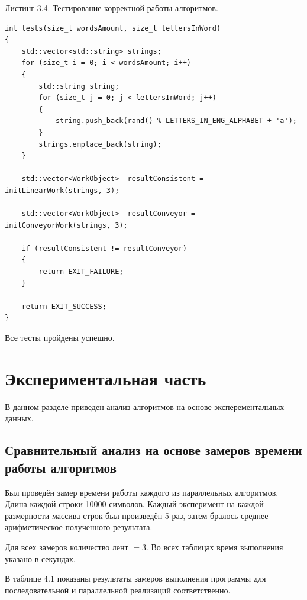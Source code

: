 \documentclass[12pt]{report}
\begin{document}
\begin{flushleft}
Листинг 3.4. Тестирование корректной работы алгоритмов.
\begin{lstlisting}
int tests(size_t wordsAmount, size_t lettersInWord) 
{
	std::vector<std::string> strings;
	for (size_t i = 0; i < wordsAmount; i++) 
	{
		std::string string;
		for (size_t j = 0; j < lettersInWord; j++) 
		{
			string.push_back(rand() % LETTERS_IN_ENG_ALPHABET + 'a');
		}
		strings.emplace_back(string);
	}
	
	std::vector<WorkObject>  resultConsistent = initLinearWork(strings, 3);
	
	std::vector<WorkObject>  resultConveyor = initConveyorWork(strings, 3);
	
	if (resultConsistent != resultConveyor)
	{
		return EXIT_FAILURE;
	}
	
	return EXIT_SUCCESS;
}
\end{lstlisting}
\end{flushleft}

Все тесты пройдены успешно.

\chapter{Экспериментальная часть}

В данном разделе приведен анализ алгоритмов на основе эксперементальных данных.

\section{Сравнительный анализ на основе замеров времени работы алгоритмов} 

Был  проведён  замер  времени  работы  каждого  из  параллельных   алгоритмов.   Длина каждой  
строки  10000  символов.   Каждый  эксперимент  на  каждой  размерности  массива строк  был 
произведён  5 раз,  затем  бралось  среднее  арифметическое полученного  результата.

Для всех  замеров  количество  лент $= 3$.
Во всех  таблицах  время  выполнения  указано в секундах.

В  таблице  4.1  показаны  результаты  замеров  выполнения  программы  для 
последовательной и параллельной  реализаций  соответственно.

\begin{figure}[h!]
	\label{figure:image}
\end{figure}
\end{document}
